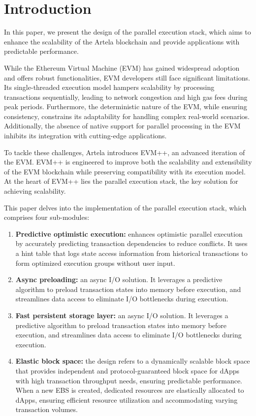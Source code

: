 
\section{Introduction}

In this paper, we present the design of the parallel execution stack, which aims to enhance the scalability of the Artela blockchain \cite{artela2023} and provide applications with predictable performance.

While the Ethereum Virtual Machine (EVM)\cite{ethereum2020evm} has gained widespread adoption and offers robust functionalities, EVM developers still face significant limitations. Its single-threaded execution model hampers scalability by processing transactions sequentially, leading to network congestion and high gas fees during peak periods. Furthermore, the deterministic nature of the EVM, while ensuring consistency, constrains its adaptability for handling complex real-world scenarios. Additionally, the absence of native support for parallel processing in the EVM inhibits its integration with cutting-edge applications.

To tackle these challenges, Artela introduces EVM++\cite{artela_evm_plus_plus}, an advanced iteration of the EVM. EVM++ is engineered to improve both the scalability and extensibility of the EVM blockchain while preserving compatibility with its execution model. At the heart of EVM++ lies the parallel execution stack, the key solution for achieving scalability.

This paper delves into the implementation of the parallel execution stack, which comprises four sub-modules:

\begin{enumerate}
  \item \textbf{Predictive optimistic execution:} enhances optimistic parallel execution by accurately predicting transaction dependencies to reduce conflicts. It uses a hint table that logs state access information from historical transactions to form optimized execution groups without user input.
  \item \textbf{Async preloading:} an async I/O solution. It leverages a predictive algorithm to preload transaction states into memory before execution, and streamlines data access to eliminate I/O bottlenecks during execution.
  \item \textbf{Fast persistent storage layer:} an async I/O solution. It leverages a predictive algorithm to preload transaction states into memory before execution, and streamlines data access to eliminate I/O bottlenecks during execution.
  \item \textbf{Elastic block space:} the design refers to a dynamically scalable block space that provides independent and protocol-guaranteed block space for dApps with high transaction throughput needs, ensuring predictable performance. When a new EBS is created, dedicated resources are elastically allocated to dApps, ensuring efficient resource utilization and accommodating varying transaction volumes.
\end{enumerate}
